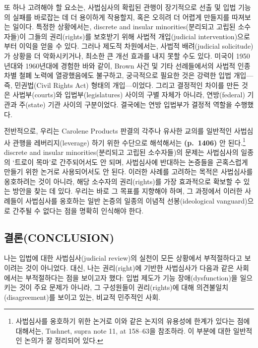 \documentclass[a4paper,12pt,oneside]{article}  %
\begin{document}
또 하나 고려해야 할 요소는, 사법심사의 확립된 관행이 장기적으로 선출 및
입법 기능의 실패를 바로잡는 데 더 용이하게 작용할지, 혹은 오히려 더
어렵게 만들지를 따져보는 일이다. 특정한 상황에서는, discrete and insular
minorities(분리되고 고립된 소수자들)이 그들의 권리(rights)를 보호받기
위해 사법적 개입(judicial intervention)으로부터 이익을 얻을 수 있다.
그러나 제도적 차원에서는, 사법적 배려(judicial solicitude)가 상황을 더
악화시키거나, 최소한 큰 개선 효과를 내지 못할 수도 있다. 미국이
1950년대와 1960년대에 경험한 바와 같이, Brown 사건 및 기타 선례들에서의
사법적 인종차별 철폐 노력에 열광했음에도 불구하고, 궁극적으로 필요한
것은 강력한 입법 개입---즉, 민권법(Civil Rights Act) 형태의
개입---이었다. 그리고 결정적인 차이를 만든 것은 사법부(courts)와
입법부(legislatures) 사이의 구별 자체가 아니라, 연방(federal) 기관과
주(state) 기관 사이의 구분이었다. 결국에는 연방 입법부가 결정적 역할을
수행했다.

전반적으로, 우리는 Carolene Products 판결의 각주나 유사한 교의를
일반적인 사법심사 관행을 레버리지(leverage) 하기 위한 수단으로
해석해서는 \textbf{(p.~1406)} 안 된다.\footnote{사법심사를 옹호하기 위한
  논거로 이와 같은 논지의 유용성에 한계가 있다는 점에 대해서는, Tushnet,
  supra note 11, at 158--63을 참조하라. 이 부분에 대한 일반적인 논의가
  잘 정리되어 있다.} discrete and insular minorities(분리되고 고립된
소수자들)의 문제는 사법심사의 일종의 `트로이 목마'로 간주되어서도 안
되며, 사법심사에 반대하는 논증들을 곤혹스럽게 만들기 위한 논거로
사용되어서도 안 된다. 이러한 사례를 고려하는 목적은 사법심사를
옹호하려는 것이 아니라, 해당 소수자의 권리(rights)를 가장 효과적으로
확보할 수 있는 방안을 찾는 데 있다. 우리는 바로 그 목표를 지향해야 하며,
그 과정에서 이러한 사례들이 사법심사를 옹호하는 일반 논증의 일종의
이념적 선봉(ideological vanguard)으로 간주될 수 없다는 점을 명확히
인식해야 한다.

\subsection{결론(CONCLUSION)}\label{uxacb0uxb860conclusion}

나는 입법에 대한 사법심사(judicial review)의 실천이 모든 상황에서
부적절하다고 보이려는 것이 아니었다. 대신, 나는 권리(right)에 기반한
사법심사가 다음과 같은 사회에서는 부적절하다는 점을 보이고자 했다: 입법
제도가 기능 장애(dysfunction)을 일으키는 것이 주요 문제가 아니라, 그
구성원들이 권리(rights)에 대해 의견불일치(disagreement)를 보이고 있는,
비교적 민주적인 사회.
\end{document}

